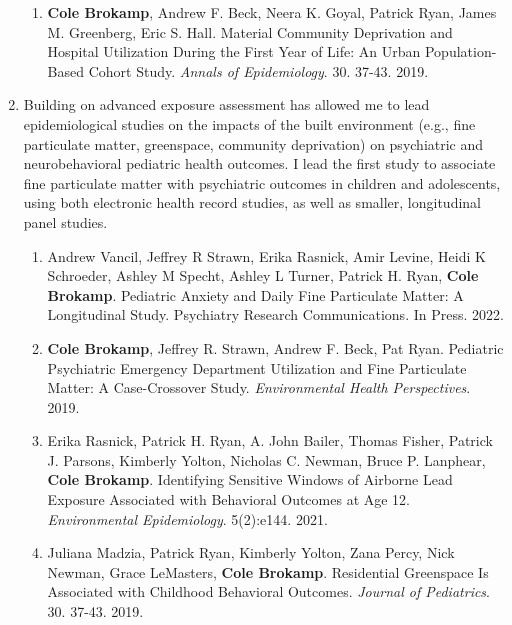\documentclass{nihbiosketch}
\begin{document}
\begin{enumerate}
\begin{enumerate}
  \item \textbf{Cole Brokamp}, Andrew F. Beck, Neera K. Goyal, Patrick Ryan,
    James M. Greenberg, Eric S. Hall. Material Community Deprivation and
    Hospital Utilization During the First Year of Life: An Urban
    Population-Based Cohort Study. \textit{Annals of Epidemiology}. 30. 37-43.
    2019.

\end{enumerate}

\item Building on advanced exposure assessment has allowed me to lead epidemiological studies on the impacts of the built environment (e.g., fine particulate matter, greenspace, community deprivation) on psychiatric and neurobehavioral pediatric health outcomes. I lead the first study to associate fine particulate matter with psychiatric outcomes in children and adolescents, using both electronic health record studies, as well as smaller, longitudinal panel studies.

  \begin{enumerate}

  \item Andrew Vancil, Jeffrey R Strawn, Erika Rasnick, Amir Levine,
    Heidi K Schroeder, Ashley M Specht, Ashley L Turner, Patrick H. Ryan,
    \textbf{Cole Brokamp}. Pediatric Anxiety and Daily Fine Particulate Matter:
    A Longitudinal Study. Psychiatry Research Communications. In Press. 2022.

  \item \textbf{Cole Brokamp}, Jeffrey R. Strawn, Andrew F. Beck, Pat Ryan.
    Pediatric Psychiatric Emergency Department Utilization and Fine
    Particulate Matter: A Case-Crossover Study. \textit{Environmental Health
      Perspectives}. 2019.
 
  \item Erika Rasnick, Patrick H. Ryan, A. John Bailer, Thomas Fisher, Patrick
    J. Parsons, Kimberly Yolton, Nicholas C. Newman, Bruce P. Lanphear,
    \textbf{Cole Brokamp}. Identifying Sensitive Windows of Airborne Lead
    Exposure Associated with Behavioral Outcomes at Age 12.
    \textit{Environmental Epidemiology}. 5(2):e144. 2021.

  \item Juliana Madzia, Patrick Ryan, Kimberly Yolton, Zana Percy, Nick Newman, Grace
    LeMasters, \textbf{Cole Brokamp}. Residential Greenspace Is Associated with Childhood
    Behavioral Outcomes. \textit{Journal of Pediatrics}. 30. 37-43. 2019.


\end{enumerate}
\end{enumerate}
\end{document}
